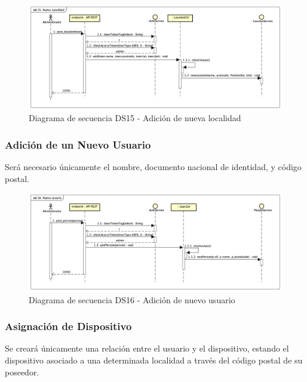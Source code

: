 \begin{figure}[H]
    \centering
    \includegraphics[width=14cm]{./img/sequence/diagram/NuevaLocalidad.png}
    \caption{Diagrama de secuencia DS15 - Adición de nueva localidad}
    \label{fig:seq.AddLocal}
\end{figure}

\subsubsection{Adición de un Nuevo Usuario}

Será necesario únicamente el nombre, documento nacional de identidad, y código postal.

\begin{figure}[H]
    \centering
    \includegraphics[width=14cm]{./img/sequence/diagram/NuevoUsuario.png}
    \caption{Diagrama de secuencia DS16 - Adición de nuevo usuario}
    \label{fig:seq.AddUser}
\end{figure}

\subsubsection{Asignación de Dispositivo}

Se creará únicamente una relación entre el usuario y el dispositivo, estando el dispositivo asociado a una determinada localidad a través del código postal de su poseedor.

